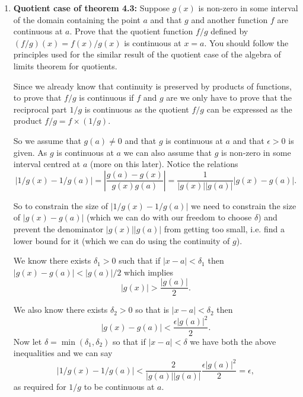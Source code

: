 \documentclass[10pt]{memoir}
\newcounter{pass}
\begin{document}

\begin{enumerate}
\setcounter{enumi}{\value{pass}}
\item
\textbf{Quotient case of theorem 4.3:} Suppose $g(x)$ is non-zero in some interval of the domain containing the point $a$ and that $g$ and another function $f$ are continuous at $a$. Prove that the quotient function $f/g$ defined by $(f/g)(x) = f(x)/g(x)$ is continuous at $x=a$. You should follow the principles used for the similar result of the quotient case of the algebra of limits theorem for quotients.

\begin{solution}
Since we already know that continuity is preserved by products of functions, to prove that $f/g$ is continuous if $f$ and $g$ are we only have to prove that the reciprocal part $1/g$ is continuous as the quotient $f/g$ can be expressed as the product $f/g = f \times (1/g)$.

So we assume that $g(a) \neq 0$ and that $g$ is continuous at $a$ and that $\epsilon>0$ is given. As $g$ is continuous at $a$ we can also assume that $g$ is non-zero in some interval centred at $a$ (more on this later). Notice the relations
$$|1/g(x) - 1/g(a)|=\left | \frac{g(a)-g(x)}{g(x)g(a)} \right | = \frac{1}{|g(x)||g(a)|} |g(x) - g(a)|.$$

So to constrain the size of $|1/g(x) - 1/g(a)|$ we need to constrain the size of $|g(x) - g(a)|$ (which we can do with our freedom to choose $\delta$) and prevent the denominator $|g(x)||g(a)|$ from getting too small, i.e. find a lower bound for it (which we can do using the continuity of $g$).

We know there exists $\delta_1>0$ such that if $|x-a|<\delta_1$ then $|g(x) - g(a)| < |g(a)|/2$ which implies $$|g(x)| > \frac{|g(a)|}{2}.$$

We also know there exists $\delta_2>0$ so that is $|x-a| < \delta_2$ then
$$|g(x)-g(a)| < \frac{ \epsilon |g(a)|^2}{2}.$$
Now let $\delta = \min(\delta_1, \delta_2)$ so that if $|x-a| < \delta$ we have both the above inequalities and we can say
$$|1/g(x) - 1/g(a)| < \frac{2}{|g(a)||g(a)|} \frac{ \epsilon |g(a)|^2}{2} = \epsilon,$$
as required for $1/g$ to be continuous at $a$.

\end{solution}


\end{enumerate}
\end{document}
